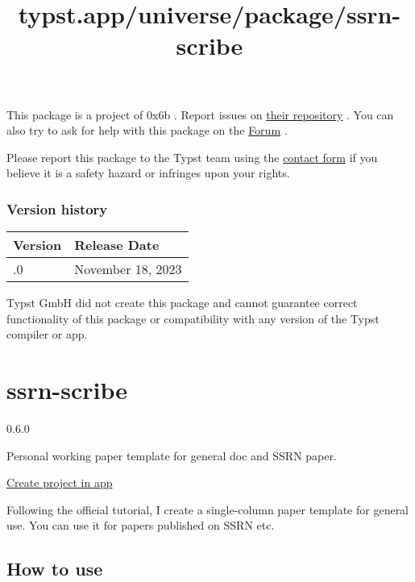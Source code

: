 This package is a project of 0x6b . Report issues on
\href{https://github.com/0x6b/typst-octique}{their repository} . You can
also try to ask for help with this package on the
\href{https://forum.typst.app}{Forum} .

Please report this package to the Typst team using the
\href{https://typst.app/contact}{contact form} if you believe it is a
safety hazard or infringes upon your rights.

\label{versions}
\subsubsection{Version history}\label{version-history}

\begin{longtable}[]{@{}ll@{}}
\toprule\noalign{}
Version & Release Date \\
\midrule\noalign{}
\endhead
\bottomrule\noalign{}
\endlastfoot
0.1.0 & November 18, 2023 \\
\end{longtable}

Typst GmbH did not create this package and cannot guarantee correct
functionality of this package or compatibility with any version of the
Typst compiler or app.


\title{typst.app/universe/package/ssrn-scribe}

\label{banner}
\label{template-thumbnail}

\section{ssrn-scribe}\label{ssrn-scribe}

{ 0.6.0 }

Personal working paper template for general doc and SSRN paper.

\href{/app?template=ssrn-scribe&version=0.6.0}{Create project in app}

\label{readme}
Following the official tutorial, I create a single-column paper template
for general use. You can use it for papers published on SSRN etc.

\subsection{How to use}\label{how-to-use}

